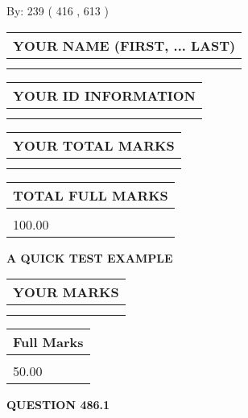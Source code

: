 \documentclass[12pt]{article}
\begin{document}
   
\hspace{1.0in} By: 
 239 ( 416 ,  613 )
   
   
   
   
\newpage 
\setcounter{page}{ 
   486001 } 
   
   
   
   
\noindent\begin{tabular}{|l|}
\hline
YOUR NAME (FIRST, ... LAST)  \\
\hline
 \\ 
 \\ 
\hline
\end{tabular}
\hspace{0.05in} \begin{tabular}{|l|}
\hline
 YOUR   ID   INFORMATION  \\
\hline
 \\ 
 \\ 
\hline
\end{tabular}
   
   
\vspace{0.2in}\noindent\begin{tabular}{|l|}
\hline
YOUR TOTAL MARKS  \\
\hline
 \\ 
 \\ 
\hline
\end{tabular}
\hspace{0.05in} \begin{tabular}{|l|}
\hline
TOTAL FULL MARKS  \\
\hline
 \\ 
100.00 \\
\hline
\end{tabular}
   
   
 \vspace{0.2in}
{\LARGE {\textbf{ A QUICK TEST EXAMPLE}}}
   
   
  
\vspace{0.2in}
  
\noindent\begin{tabular}{|l|}
\hline
 YOUR MARKS  \\
\hline
 \\ 
 \\ 
\hline
\end{tabular}
\hspace{0.05in} \begin{tabular}{|l|}
\hline
 Full Marks  \\
\hline
 \\ 
50.00 \\
\hline
\end{tabular}
{\textbf{\Large{QUESTION
486.1 
}}}
  
\end{document}
